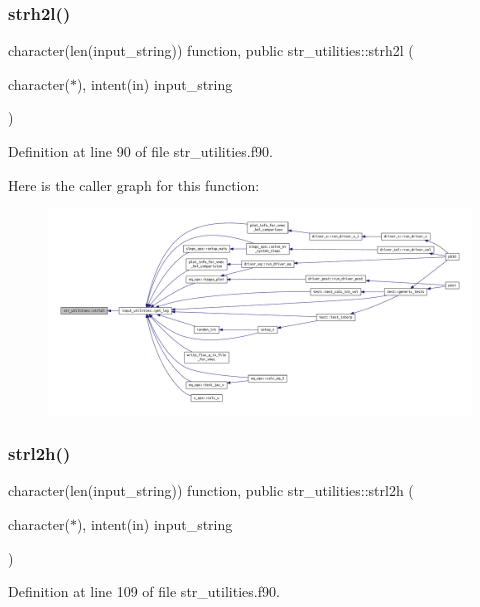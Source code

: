 \subsubsection{\texorpdfstring{strh2l()}{strh2l()}}
{\footnotesize\ttfamily character(len(input\+\_\+string)) function, public str\+\_\+utilities\+::strh2l (\begin{DoxyParamCaption}\item[{character($\ast$), intent(in)}]{input\+\_\+string }\end{DoxyParamCaption})}



Definition at line 90 of file str\+\_\+utilities.\+f90.

Here is the caller graph for this function\+:
\nopagebreak
\begin{figure}[H]
\begin{center}
\leavevmode
\includegraphics[width=350pt]{namespacestr__utilities_a219964a283968cc6a968db0197d2187e_icgraph}
\end{center}
\end{figure}
\mbox{\label{namespacestr__utilities_a7e2e441d509c12045a3373819040a806}} 
\subsubsection{\texorpdfstring{strl2h()}{strl2h()}}
{\footnotesize\ttfamily character(len(input\+\_\+string)) function, public str\+\_\+utilities\+::strl2h (\begin{DoxyParamCaption}\item[{character($\ast$), intent(in)}]{input\+\_\+string }\end{DoxyParamCaption})}



Definition at line 109 of file str\+\_\+utilities.\+f90.

